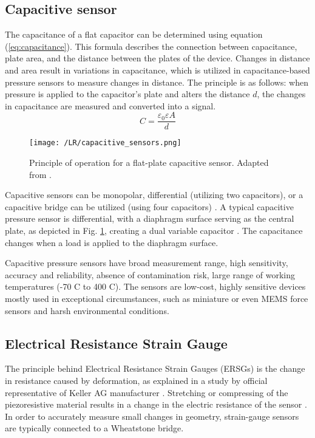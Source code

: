 \subsection{Capacitive sensor}
The capacitance of a flat capacitor can be determined using equation (\ref*{eq:capacitance}). 
This formula describes the connection between capacitance, plate area, and the distance between the plates of the device. 
Changes in distance and area result in variations in capacitance, which is utilized in capacitance-based pressure sensors to measure changes in distance.
The principle is as follows: when pressure is applied to the capacitor's plate and alters the distance $d$, the changes in capacitance are measured and converted into a signal.
\begin{equation}
    \label{eq:capacitance}
    C = \frac{\varepsilon_0 \varepsilon A}{d}
\end{equation}
\begin{figure}[t]
    \centering
    \texttt{[image: /LR/capacitive\_sensors.png]}
    \caption{Principle of operation for a flat-plate capacitive sensor. Adapted from \cite[Fig. 7.6]{handbook_sensors}.}
    \label{fig:capacitive_sensors}
\end{figure}

Capacitive sensors can be monopolar, differential (utilizing two capacitors), or a capacitive bridge can be utilized (using four capacitors) \cite{handbook_sensors}.
A typical capacitive pressure sensor is differential, with a diaphragm surface serving as the central plate, as depicted in Fig. \ref*{fig:capacitive_sensors}, creating a dual variable capacitor \cite{pressure_sens_calibration_stat_dyn}.
The capacitance changes when a load is applied to the diaphragm surface. 

Capacitive pressure sensors have broad measurement range, high sensitivity, accuracy and reliability, absence of contamination risk, large range of working temperatures (-70 \textdegree C to 400 \textdegree C).
The sensors are low-cost, highly sensitive devices mostly used in exceptional circumstances, such as miniature or even MEMS force sensors \cite*{multi_axis_force_sensors_review} and harsh environmental conditions.

\subsection{Electrical Resistance Strain Gauge}
The principle behind Electrical Resistance Strain Gauges (ERSGs) is the change in resistance caused 
by deformation, as explained in a study by official representative of Keller AG manufacturer \cite{keller_article}. 
Stretching or compressing of the piezoresistive material results in a change in the electric resistance of the sensor 
\cite{multi_axis_force_sensors_review}. 
In order to accurately measure small changes in geometry, 
strain-gauge sensors are typically connected to a Wheatstone bridge.

